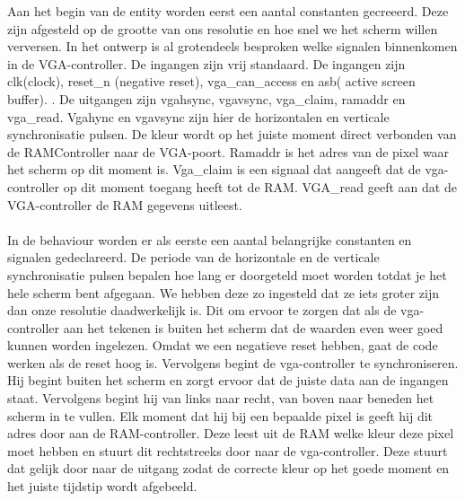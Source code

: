 \documentclass{scrartcl}  %
\begin{document}
Aan het begin van de entity worden eerst een aantal constanten gecreeerd. Deze zijn afgesteld op de grootte van ons resolutie en hoe snel we het scherm willen verversen. In het ontwerp is al grotendeels besproken welke signalen binnenkomen in de VGA-controller. De ingangen zijn vrij standaard. De ingangen zijn clk(clock), reset\_n (negative reset), vga\_can\_access en asb( active screen buffer). . De uitgangen zijn vgahsync, vgavsync, vga\_claim, ramaddr en vga\_read. Vgahync en vgavsync zijn hier de horizontalen en verticale synchronisatie pulsen. De kleur wordt op het juiste moment direct verbonden van de RAMController naar de VGA-poort. Ramaddr is het adres van de pixel waar het scherm op dit moment is. Vga\_claim is een signaal dat aangeeft dat de vga-controller op dit moment toegang heeft tot de RAM. VGA\_read geeft aan dat de VGA-controller de RAM gegevens uitleest.
\\\\
 In de behaviour worden er als eerste  een aantal belangrijke constanten en signalen gedeclareerd. De periode van de horizontale en de verticale synchronisatie pulsen bepalen hoe lang er doorgeteld moet worden totdat je het hele scherm bent afgegaan. We hebben deze zo ingesteld dat ze iets groter zijn dan onze resolutie daadwerkelijk is. Dit om ervoor te zorgen dat als de vga-controller aan het tekenen is buiten het scherm dat de waarden even weer goed kunnen worden ingelezen. Omdat we een negatieve reset hebben, gaat de code werken als de reset hoog is. Vervolgens begint de vga-controller te synchroniseren. Hij begint buiten het scherm en zorgt ervoor dat de juiste data aan de ingangen staat. Vervolgens begint hij van links naar recht, van boven naar beneden het scherm in te vullen. Elk moment dat hij bij een bepaalde pixel is geeft hij dit adres door aan de RAM-controller. Deze leest uit de RAM welke kleur deze pixel moet hebben en stuurt dit rechtstreeks door naar de vga-controller. Deze stuurt dat gelijk door naar de uitgang zodat de correcte kleur op het goede moment en het juiste tijdstip wordt afgebeeld. 
\end{document}
